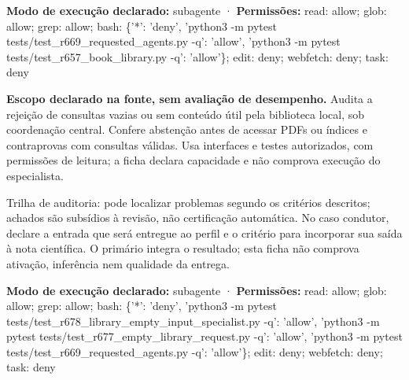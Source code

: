 \begin{arquitetura}
\textbf{Modo de execução declarado:} subagente · \textbf{Permissões:} read: allow; glob: allow; grep: allow; bash: \{'*': 'deny', 'python3 -m pytest tests/test\_r669\_requested\_agents.py -q': 'allow', 'python3 -m pytest tests/test\_r657\_book\_library.py -q': 'allow'\}; edit: deny; webfetch: deny; task: deny
\end{arquitetura}


\begin{descricao}
\textbf{Escopo declarado na fonte, sem avaliação de desempenho.}
Audita a rejeição de consultas vazias ou sem conteúdo útil pela biblioteca local, sob coordenação central. Confere abstenção antes de acessar PDFs ou índices e contraprovas com consultas válidas. Usa interfaces e testes autorizados, com permissões de leitura; a ficha declara capacidade e não comprova execução do especialista.
\end{descricao}

\begin{funcao}
Trilha de auditoria: pode localizar problemas segundo os critérios descritos; achados são subsídios à revisão, não certificação automática. No caso condutor, declare a entrada que será entregue ao perfil e o critério para incorporar sua saída à nota científica. O primário integra o resultado; esta ficha não comprova ativação, inferência nem qualidade da entrega.
\end{funcao}

\begin{arquitetura}
\textbf{Modo de execução declarado:} subagente · \textbf{Permissões:} read: allow; glob: allow; grep: allow; bash: \{'*': 'deny', 'python3 -m pytest tests/test\_r678\_library\_empty\_input\_specialist.py -q': 'allow', 'python3 -m pytest tests/test\_r677\_empty\_library\_request.py -q': 'allow', 'python3 -m pytest tests/test\_r669\_requested\_agents.py -q': 'allow'\}; edit: deny; webfetch: deny; task: deny
\end{arquitetura}


